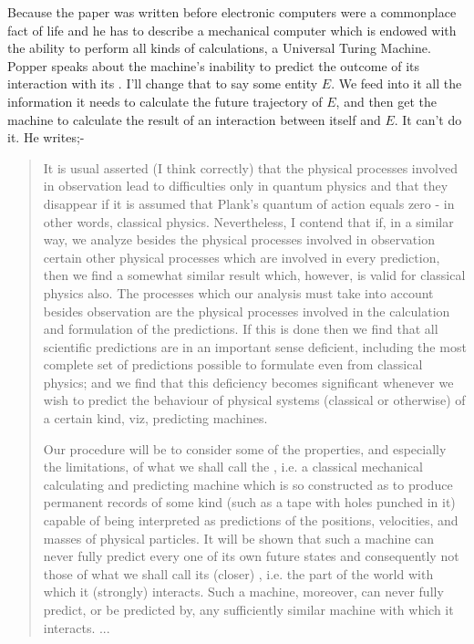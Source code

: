 \documentclass{article}
\begin{document}
Because the paper was written before electronic computers were a commonplace fact of life and he has to describe a mechanical computer which is endowed with the ability to perform all kinds of calculations, a Universal Turing Machine. Popper speaks about the machine's inability to predict the outcome of its interaction with its . I'll change that to say some entity $E$. We feed into it all the information it needs to calculate the future trajectory of $E$, and then get the machine to calculate the result of an interaction between itself and $E$. It can't do it. He writes;-
\begin{quotation}
  It is usual asserted (I think correctly) that the physical processes involved in observation lead to difficulties only in quantum physics and that they disappear if it is assumed that Plank's quantum of action equals zero - in other words, classical physics. Nevertheless, I contend that if, in a similar way, we analyze besides the physical processes involved in observation certain other physical processes which are involved in every prediction, then we find a somewhat similar result which, however, is valid for classical physics also. The processes which our analysis must take into account besides observation are the physical processes involved in the calculation and formulation of the predictions. If this is done then we find that all scientific predictions are in an important sense deficient, including the most complete set of predictions possible to formulate even from classical physics; and we find that this deficiency becomes significant whenever we wish to predict the behaviour of physical systems (classical or otherwise) of a certain kind, viz, predicting machines.

  Our procedure will be to consider some of the properties, and especially the limitations, of what we shall call the , i.e. a classical mechanical calculating and predicting machine which is so constructed as to produce permanent records of some kind (such as a tape with holes punched in it) capable of being interpreted as predictions of the positions, velocities, and masses of physical particles. It will be shown that such a machine can never fully predict every one of its own future states and consequently not those of what we shall call its (closer) , i.e. the part of the world with which it (strongly) interacts. Such a machine, moreover, can never fully predict, or be predicted by, any sufficiently similar machine with which it interacts. ...
  \par
  \hfill \autocite[p.~118]{Popper1950a}
\end{quotation}
\end{document}
